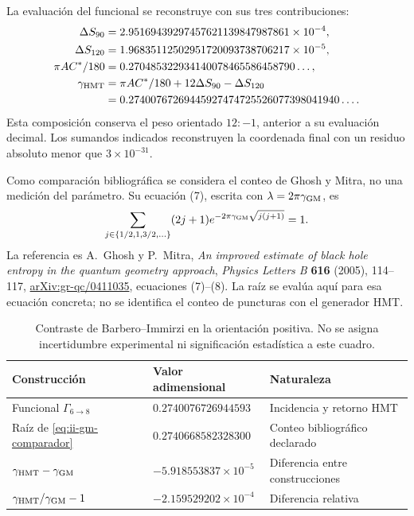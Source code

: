 La evaluación del funcional se reconstruye con sus tres contribuciones:
\begin{align*}
 \Delta S_{90}&=2.95169439297457621139847987861\times10^{-4},\\
 \Delta S_{120}&=1.96835112502951720093738706217\times10^{-5},\\
 \pi AC^*/180&=0.270485322934140078465586458790\ldots,\\
 \gamma_{\rm HMT}&=\pi AC^*/180+12\Delta S_{90}-\Delta S_{120}\\
 &=0.27400767269445927474725526077398041940\ldots.
\end{align*}
Esta composición conserva el peso orientado \(12:-1\), anterior a su
evaluación decimal. Los sumandos indicados reconstruyen la coordenada
final con un residuo absoluto menor que \(3\times10^{-31}\).

Como comparación bibliográfica se considera el conteo de Ghosh y Mitra,
no una medición del parámetro. Su ecuación (7), escrita con
\(\lambda=2\pi\gamma_{\rm GM}\), es
\begin{equation}
 \sum_{j\in\{1/2,1,3/2,\ldots\}}(2j+1)
 e^{-2\pi\gamma_{\rm GM}\sqrt{j(j+1)}}=1.
 \label{eq:ii-gm-comparador}
\end{equation}
La referencia es A.~Ghosh y P.~Mitra,
\emph{An improved estimate of black hole entropy in the quantum geometry
approach}, \emph{Physics Letters B} \textbf{616} (2005), 114--117,
\href{https://arxiv.org/abs/gr-qc/0411035}{arXiv:gr-qc/0411035},
ecuaciones (7)--(8). La raíz se evalúa aquí para esa ecuación concreta;
no se identifica el conteo de puncturas con el generador HMT.

\begin{table}[htbp]
\centering\small
\begin{tabular}{@{}lll@{}}
\toprule
Construcción & Valor adimensional & Naturaleza\\
\midrule
Funcional \(\Gamma_{6\to8}\) & \(0.2740076726944593\) & Incidencia y retorno HMT\\
Raíz de \eqref{eq:ii-gm-comparador} & \(0.2740668582328300\) & Conteo bibliográfico declarado\\
\midrule
\(\gamma_{\rm HMT}-\gamma_{\rm GM}\) & \(-5.918553837\times10^{-5}\) & Diferencia entre construcciones\\
\(\gamma_{\rm HMT}/\gamma_{\rm GM}-1\) & \(-2.159529202\times10^{-4}\) & Diferencia relativa\\
\bottomrule
\end{tabular}
\caption{Contraste de Barbero--Immirzi en la orientación positiva. No se
asigna incertidumbre experimental ni significación estadística a este cuadro.}
\label{tab:ii-barbero-comparacion}
\end{table}


